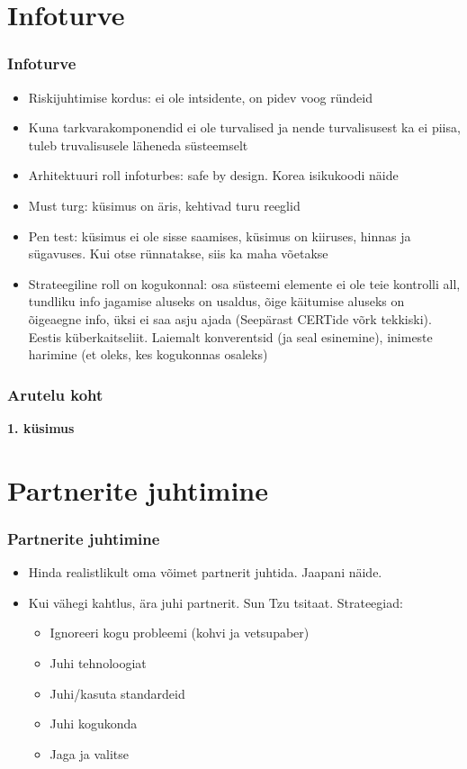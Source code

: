 \section{Infoturve}
\begin{frame}[fragile]
  \frametitle{Infoturve}
	\begin{itemize}
		\item Riskijuhtimise kordus: ei ole intsidente, on pidev voog ründeid
		\item Kuna tarkvarakomponendid ei ole turvalised ja nende turvalisusest ka ei piisa, tuleb truvalisusele läheneda süsteemselt
		\item Arhitektuuri roll infoturbes: safe by design. Korea isikukoodi näide
		\item Must turg: küsimus on äris, kehtivad turu reeglid
		\item Pen test: küsimus ei ole sisse saamises, küsimus on kiiruses, hinnas ja sügavuses. Kui otse rünnatakse, siis ka maha võetakse
		\item Strateegiline roll on kogukonnal: osa süsteemi elemente ei ole teie kontrolli all, tundliku info jagamise aluseks on usaldus, õige käitumise aluseks on õigeaegne info, üksi ei saa asju ajada (Seepärast CERTide võrk tekkiski). Eestis küberkaitseliit. Laiemalt konverentsid (ja seal esinemine), inimeste harimine (et oleks, kes kogukonnas osaleks) 
	\end{itemize}
\end{frame}


\begin{frame}[fragile]
  \frametitle{Arutelu koht}
		\begin{center}
			\textbf{1. küsimus}
		\end{center}
\end{frame}

\section{Partnerite juhtimine}
\begin{frame}[fragile]
  \frametitle{Partnerite juhtimine}
	\begin{itemize}
		\item Hinda realistlikult oma võimet partnerit juhtida. Jaapani näide. 
		\item Kui vähegi kahtlus, ära juhi partnerit. Sun Tzu tsitaat. Strateegiad:
			\begin{itemize}
				\item Ignoreeri kogu probleemi (kohvi ja vetsupaber)
				\item Juhi tehnoloogiat
				\item Juhi/kasuta standardeid
				\item Juhi kogukonda
				\item Jaga ja valitse
			\end{itemize}
	\end{itemize}
\end{frame}

